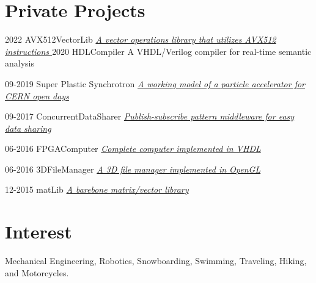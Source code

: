 \documentclass[]{cv-style}          %
\begin{document}
\section{Private Projects}

\begin{entrylist}
    \entry
    {2022}
    {AVX512VectorLib}
    {}
    {\emph{\href{https://github.com/marso329/AVX512VectorLib}{A vector operations library that utilizes AVX512 instructions }}}
    \entry
    {2020}
    {HDLCompiler}
    {}
    {A VHDL/Verilog compiler for real-time semantic analysis }
    
    \entry
    {09-2019}
    {Super Plastic Synchrotron}
    {}
    {\emph{\href{https://github.com/marso329/SuperPlasticSynchrotron}{A working model of a particle accelerator for CERN open days}}}
    
    
                \entry
    {09-2017}
    {ConcurrentDataSharer}
    {} 
    {\emph{\href{https://github.com/marso329/ConcurrentDataSharer}{Publish-subscribe pattern middleware for easy data sharing}}}
    
    
  \entry
    {06-2016}
    {FPGAComputer}
    {}
    {\emph{\href{https://github.com/marso329/FPGAComputer}{Complete computer implemented in VHDL}}}

\end{entrylist}

\begin{entrylist}


    
      \entry
    {06-2016}
    {3DFileManager}
    {}
    {\emph{\href{https://github.com/marso329/3DFileManager}{A 3D file manager implemented in OpenGL}}}
   
    
    
                   \entry
    {12-2015}
    {matLib}
    {}
    {\emph{\href{https://github.com/marso329/matLib}{A barebone matrix/vector library }}}
\end{entrylist}
\section{Interest}
Mechanical Engineering, Robotics, Snowboarding, Swimming, Traveling, Hiking, and Motorcycles.
\end{document}
